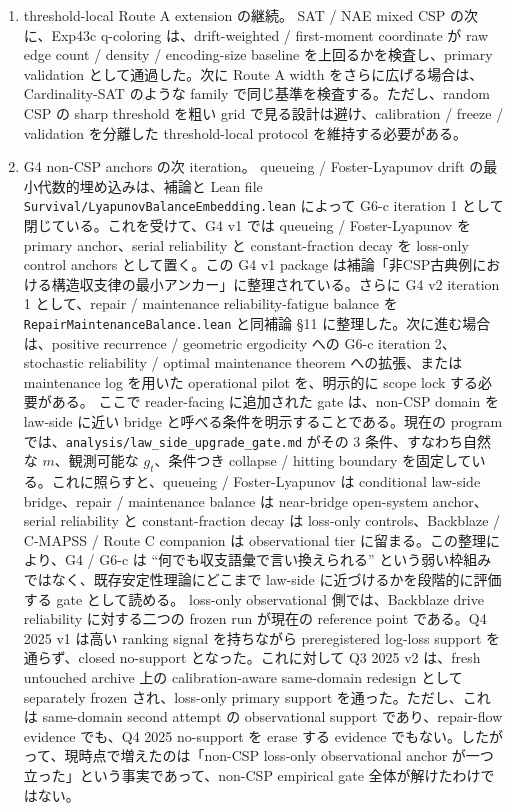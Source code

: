 \documentclass[12pt,a4paper]{article}
\begin{document}
\begin{enumerate}
\def\labelenumi{\arabic{enumi}.}
\item
  threshold-local Route A extension の継続。 SAT / NAE mixed CSP の次に、Exp43c q-coloring は、drift-weighted / first-moment coordinate が raw edge count / density / encoding-size baseline を上回るかを検査し、primary validation として通過した。次に Route A width をさらに広げる場合は、Cardinality-SAT のような family で同じ基準を検査する。ただし、random CSP の sharp threshold を粗い grid で見る設計は避け、calibration / freeze / validation を分離した threshold-local protocol を維持する必要がある。
\item
  G4 non-CSP anchors の次 iteration。 queueing / Foster-Lyapunov drift の最小代数的埋め込みは、補論と Lean file \texttt{Survival/LyapunovBalanceEmbedding.lean} によって G6-c iteration 1 として閉じている。これを受けて、G4 v1 では queueing / Foster-Lyapunov を primary anchor、serial reliability と constant-fraction decay を loss-only control anchors として置く。この G4 v1 package は補論「非CSP古典例における構造収支律の最小アンカー」に整理されている。さらに G4 v2 iteration 1 として、repair / maintenance reliability-fatigue balance を \texttt{RepairMaintenanceBalance.lean} と同補論 §11 に整理した。次に進む場合は、positive recurrence / geometric ergodicity への G6-c iteration 2、stochastic reliability / optimal maintenance theorem への拡張、または maintenance log を用いた operational pilot を、明示的に scope lock する必要がある。 ここで reader-facing に追加された gate は、non-CSP domain を law-side に近い bridge と呼べる条件を明示することである。現在の program では、\texttt{analysis/law\_side\_upgrade\_gate.md} がその 3 条件、すなわち自然な \(m\)、観測可能な \(g_{t}\)、条件つき collapse / hitting boundary を固定している。これに照らすと、queueing / Foster-Lyapunov は conditional law-side bridge、repair / maintenance balance は near-bridge open-system anchor、serial reliability と constant-fraction decay は loss-only controls、Backblaze / C-MAPSS / Route C companion は observational tier に留まる。この整理により、G4 / G6-c は ``何でも収支語彙で言い換えられる'' という弱い枠組みではなく、既存安定性理論にどこまで law-side に近づけるかを段階的に評価する gate として読める。 loss-only observational 側では、Backblaze drive reliability に対する二つの frozen run が現在の reference point である。Q4 2025 v1 は高い ranking signal を持ちながら preregistered log-loss support を通らず、closed no-support となった。これに対して Q3 2025 v2 は、fresh untouched archive 上の calibration-aware same-domain redesign として separately frozen され、loss-only primary support を通った。ただし、これは same-domain second attempt の observational support であり、repair-flow evidence でも、Q4 2025 no-support を erase する evidence でもない。したがって、現時点で増えたのは「non-CSP loss-only observational anchor が一つ立った」という事実であって、non-CSP empirical gate 全体が解けたわけではない。

\end{enumerate}
\end{document}
